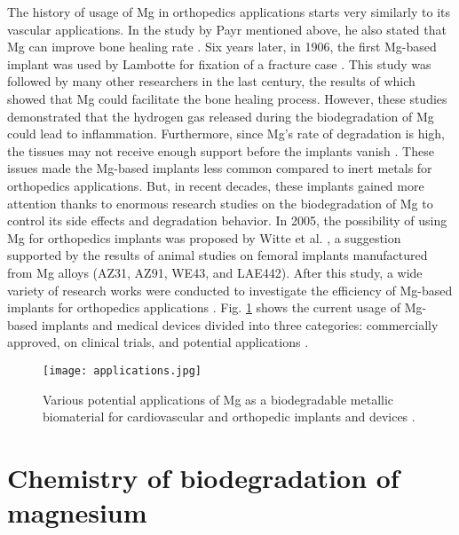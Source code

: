 The history of usage of Mg in orthopedics applications starts very similarly to its vascular applications. In the study by Payr mentioned above, he also stated that Mg can improve bone healing rate \cite{Witte2010}. Six years later, in 1906, the first Mg-based implant was used by Lambotte for fixation of a fracture case \cite{lambotte1909technique,lambotte1932utilisation}. This study was followed by many other researchers in the last century, the results of which showed that Mg could facilitate the bone healing process. However, these studies demonstrated that the hydrogen gas released during the biodegradation of Mg could lead to inflammation. Furthermore, since Mg's rate of degradation is high, the tissues may not receive enough support before the implants vanish \cite{Witte2010}. These issues made the Mg-based implants less common compared to inert metals for orthopedics applications. But, in recent decades, these implants gained more attention thanks to enormous research studies on the biodegradation of Mg to control its side effects and degradation behavior. In 2005, the possibility of using Mg for orthopedics implants was proposed by Witte et al. \cite{Witte2005}, a suggestion supported by the results of animal studies on femoral implants manufactured from Mg alloys (AZ31, AZ91, WE43, and LAE442). After this study, a wide variety of research works were conducted to investigate the efficiency of Mg-based implants for orthopedics applications \cite{Wang2020,Huang2020,Zhao2017}. Fig. \ref{fig:intro_applications} shows the current usage of Mg-based implants and medical devices divided into three categories: commercially approved, on clinical trials, and potential applications \cite{Han2019}.

\begin{figure}
\centering
\medskip
\texttt{[image: applications.jpg]}
\caption[Various potential applications of Mg as a biodegradable biomaterial]{Various potential applications of Mg as a biodegradable metallic biomaterial for cardiovascular and orthopedic implants and devices \cite{Han2019}.} 
\label{fig:intro_applications}
\end{figure}


\section{Chemistry of biodegradation of magnesium}


